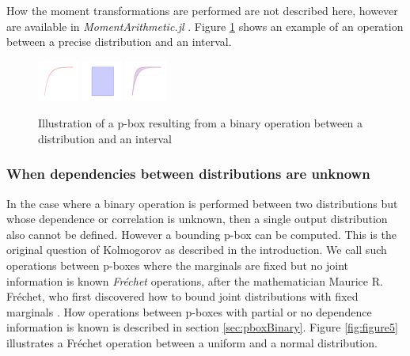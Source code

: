 \documentclass{juliacon}
\begin{document}
How the moment transformations are performed are not described here, however are available in \textit{MomentArithmetic.jl} \cite{ferson2021distribution}. Figure \ref{fig:figure4} shows an example of an operation between a precise distribution and an interval.


\begin{figure}[htp]

  \centering
  \includegraphics[width=0.12\textwidth]{../examples/JuliaCon/fig4/fig4_dist.pdf}
  \raisebox{8.0mm}{\noindent\Large*}
  \includegraphics[width=0.12\textwidth]{../examples/JuliaCon/fig4/fig4_in.pdf}
  \raisebox{9.0mm}{{\Large$\rightarrow$}}
  \includegraphics[width=0.12\textwidth]{../examples/JuliaCon/fig4/fig4_pbox.pdf}
  

  \caption{Illustration of a p-box resulting from a binary operation between a distribution and an interval}
  \label{fig:figure4}
  
\end{figure}


\subsubsection{When dependencies between distributions are unknown} \hfill \break

In the case where a binary operation is performed between two distributions but whose dependence or correlation is unknown, then a single output distribution also cannot be defined. However a bounding p-box can be computed. This is the original question of Kolmogorov as described in the introduction. We call such operations between p-boxes where the marginals are fixed but no joint information is known \textit{Fréchet} operations, after the mathematician Maurice R. Fréchet, who first discovered how to bound joint distributions with fixed marginals \cite{frechet1935generalisation}. How operations between p-boxes with partial or no dependence information is known is described in section \ref{sec:pboxBinary}. Figure \ref{fig:figure5} illustrates a Fréchet operation between a uniform and a normal distribution.
\end{document}
